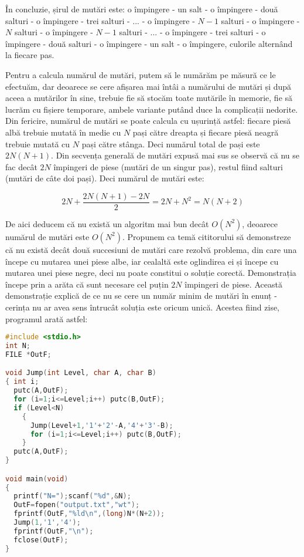 În concluzie, șirul de mutări este: o împingere - un salt - o împingere - două
salturi - o împingere - trei salturi - ... - o împingere - $N-1$ salturi - o
împingere - $N$ salturi - o împingere - $N-1$ salturi - ... - o împingere -
trei salturi - o împingere - două salturi - o împingere - un salt - o
împingere, culorile alternând la fiecare pas.

Pentru a calcula numărul de mutări, putem să le numărăm pe măsură ce le
efectuăm, dar deoarece se cere afișarea mai întâi a numărului de mutări și
după aceea a mutărilor în sine, trebuie fie să stocăm toate mutările în
memorie, fie să lucrăm cu fișiere temporare, ambele variante putând duce la
complicații nedorite. Din fericire, numărul de mutări se poate calcula cu
ușurință astfel: fiecare piesă albă trebuie mutată în medie cu $N$ pași către
dreapta și fiecare piesă neagră trebuie mutată cu $N$ pași către stânga. Deci
numărul total de pași este $2N(N+1).$ Din secvența generală de mutări expusă
mai sus se observă că nu se fac decât $2N$ împingeri de piese (mutări de un
singur pas), restul fiind salturi (mutări de câte doi pași). Deci numărul de
mutări este:

\begin{equation}
  2N + \frac{2N(N + 1) - 2N}{2} = 2N + N^2 = N(N + 2)
\end{equation}

De aici deducem că nu există un algoritm mai bun decât $O(N^2)$, deoarece
numărul de mutări este $O(N^2)$. Propunem ca temă cititorului să demonstreze
că nu există decât două succesiuni de mutări care rezolvă problema, din care
una începe cu mutarea unei piese albe, iar cealaltă este oglindirea ei și
începe cu mutarea unei piese negre, deci nu poate constitui o soluție
corectă. Demonstrația începe prin a arăta că sunt necesare cel puțin $2N$
împingeri de piese. Această demonstrație explică de ce nu se cere un număr
minim de mutări în enunț - cerința nu ar avea sens întrucât soluția este
oricum unică.  Acestea fiind zise, programul arată astfel:

\begin{lstlisting}[language=C]
#include <stdio.h>
int N;
FILE *OutF;

void Jump(int Level, char A, char B)
{ int i;
  putc(A,OutF);
  for (i=1;i<=Level;i++) putc(B,OutF);
  if (Level<N)
    {
      Jump(Level+1,'1'+'2'-A,'4'+'3'-B);
      for (i=1;i<=Level;i++) putc(B,OutF);
    }
  putc(A,OutF);
}

void main(void)
{
  printf("N=");scanf("%d",&N);
  OutF=fopen("output.txt","wt");
  fprintf(OutF,"%ld\n",(long)N*(N+2));
  Jump(1,'1','4');
  fprintf(OutF,"\n");
  fclose(OutF);
}
\end{lstlisting}
